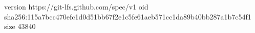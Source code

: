 version https://git-lfs.github.com/spec/v1
oid sha256:115a7bcc470efc1d0d51bb67f2e1c5fe61aeb571cc1da89b40bb287a1b7c54f1
size 43840
